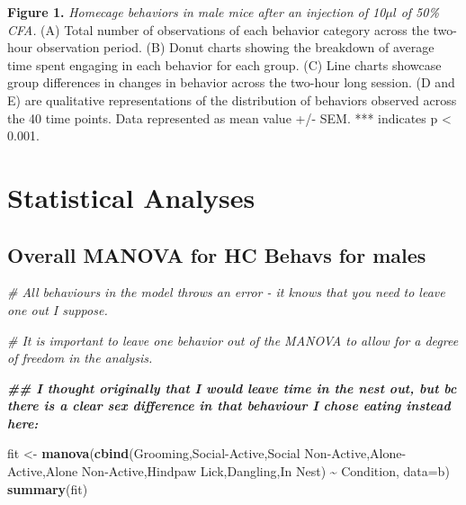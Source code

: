 \documentclass[
]{book}
\newenvironment{Shaded}{\begin{snugshade}}{\end{snugshade}}
\newcommand{\AttributeTok}[1]{\textcolor[rgb]{0.13,0.29,0.53}{#1}}
\newcommand{\CommentTok}[1]{\textcolor[rgb]{0.56,0.35,0.01}{\textit{#1}}}
\newcommand{\DocumentationTok}[1]{\textcolor[rgb]{0.56,0.35,0.01}{\textbf{\textit{#1}}}}
\newcommand{\FunctionTok}[1]{\textcolor[rgb]{0.13,0.29,0.53}{\textbf{#1}}}
\newcommand{\NormalTok}[1]{#1}
\newcommand{\OtherTok}[1]{\textcolor[rgb]{0.56,0.35,0.01}{#1}}
\newcommand{\SpecialCharTok}[1]{\textcolor[rgb]{0.81,0.36,0.00}{\textbf{#1}}}
\newcommand{\StringTok}[1]{\textcolor[rgb]{0.31,0.60,0.02}{#1}}
\begin{document}
\textbf{Figure 1.} \emph{Homecage behaviors in male mice after an injection of 10}\(\mu l\) \emph{of 50\% CFA.} (A) Total number of observations of each behavior category across the two-hour observation period. (B) Donut charts showing the breakdown of average time spent engaging in each behavior for each group. (C) Line charts showcase group differences in changes in behavior across the two-hour long session. (D and E) are qualitative representations of the distribution of behaviors observed across the 40 time points. Data represented as mean value +/- SEM. *** indicates p \textless{} 0.001.

\hypertarget{statistical-analyses}{%
\section*{Statistical Analyses}\label{statistical-analyses}}

\hypertarget{overall-manova-for-hc-behavs-for-males}{%
\subsection*{Overall MANOVA for HC Behavs for males}\label{overall-manova-for-hc-behavs-for-males}}

\begin{Shaded}
\begin{Highlighting}[]
\CommentTok{\# All behaviours in the model throws an error {-} it knows that you need to leave one out I suppose. }

\CommentTok{\# It is important to leave one behavior out of the MANOVA to allow for a degree of freedom in the analysis. }

\DocumentationTok{\#\# I thought originally that I would leave time in the nest out, but bc there is a clear sex difference in that behaviour I chose eating instead here: }

\NormalTok{fit }\OtherTok{\textless{}{-}} \FunctionTok{manova}\NormalTok{(}\FunctionTok{cbind}\NormalTok{(Grooming,}\StringTok{\textasciigrave{}}\AttributeTok{Social{-}Active}\StringTok{\textasciigrave{}}\NormalTok{,}\StringTok{\textasciigrave{}}\AttributeTok{Social Non{-}Active}\StringTok{\textasciigrave{}}\NormalTok{,}\StringTok{\textasciigrave{}}\AttributeTok{Alone{-}Active}\StringTok{\textasciigrave{}}\NormalTok{,}\StringTok{\textasciigrave{}}\AttributeTok{Alone Non{-}Active}\StringTok{\textasciigrave{}}\NormalTok{,}\StringTok{\textasciigrave{}}\AttributeTok{Hindpaw Lick}\StringTok{\textasciigrave{}}\NormalTok{,}\StringTok{\textasciigrave{}}\AttributeTok{Dangling}\StringTok{\textasciigrave{}}\NormalTok{,}\StringTok{\textasciigrave{}}\AttributeTok{In Nest}\StringTok{\textasciigrave{}}\NormalTok{) }\SpecialCharTok{\textasciitilde{}}\NormalTok{ Condition, }\AttributeTok{data=}\NormalTok{b)}
\FunctionTok{summary}\NormalTok{(fit)}
\end{Highlighting}
\end{Shaded}
\end{document}
